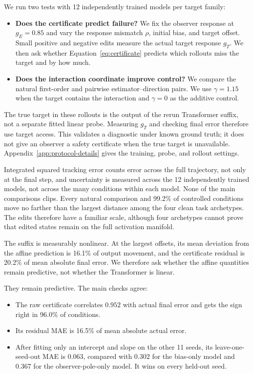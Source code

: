 We run two tests with 12 independently trained models per target family:

\begin{itemize}
  \item \textbf{Does the certificate predict failure?} We fix the observer
  response at $g_E=0.85$ and vary the response mismatch $\rho$, initial bias,
  and target offset. Small positive and negative edits measure the actual target
  response $g_T$. We then ask whether Equation~\ref{eq:certificate} predicts
  which rollouts miss the target and by how much.

  \item \textbf{Does the interaction coordinate improve control?} We compare
  the natural first-order and pairwise estimator--direction pairs. We use
  $\gamma=1.15$ when the target contains the interaction and $\gamma=0$ as the
  additive control.
\end{itemize}

The true target in these rollouts is the output of the rerun Transformer
suffix, not a separate fitted linear probe. Measuring $g_T$ and checking final
error therefore use target access. This validates a diagnostic under known
ground truth; it does not give an observer a safety certificate when the true
target is unavailable. Appendix~\ref{app:protocol-details} gives the training,
probe, and rollout settings.

Integrated squared tracking error counts error across the full trajectory, not
only at the final step, and uncertainty is measured across the 12 independently
trained models, not across the many conditions within each model. None of the
main comparisons clips. Every natural comparison and 99.2\% of controlled
conditions move no farther than the largest distance among the four clean task
archetypes. The edits therefore have a familiar scale, although four archetypes
cannot prove that edited states remain on the full activation manifold.

The suffix is measurably nonlinear. At the largest offsets, its mean deviation
from the affine prediction is 16.1\% of output movement, and the certificate
residual is 20.2\% of mean absolute final error. We therefore ask whether the
affine quantities remain predictive, not whether the Transformer is linear.

They remain predictive. The main checks agree:

\begin{itemize}
  \item The raw certificate correlates $0.952$ with actual final error and gets
  the sign right in 96.0\% of conditions.
  \item Its residual MAE is 16.5\% of mean absolute actual error.
  \item After fitting only an intercept and slope on the other 11 seeds, its
  leave-one-seed-out MAE is $0.063$, compared with $0.302$ for the bias-only
  model and $0.367$ for the observer-pole-only model. It wins on every held-out seed.
\end{itemize}

